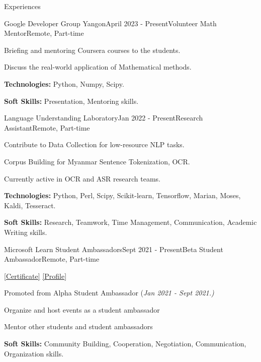 \documentclass{resume} %
\begin{document}

\begin{rSection}{Experiences}

    \begin{rSubsection}{Google Developer Group Yangon}{April 2023 - Present}{Volunteer Math Mentor}{Remote, Part-time}
        \item Briefing and mentoring Coursera courses to the students.
        \item Discuss the real-world application of Mathematical methods.
        \item \textbf{Technologies:} Python, Numpy, Scipy.
        \item {\textbf{Soft Skills:} Presentation, Mentoring skills.}
    \end{rSubsection}

    \begin{rSubsection}{Language Understanding Laboratory}{Jan 2022 - Present}{Research Assistant}{Remote, Part-time}
        \item Contribute to Data Collection for low-resource NLP tasks.
        \item Corpus Building for Myanmar Sentence Tokenization, OCR.
        \item Currently active in OCR and ASR research teams.
        \item \textbf{Technologies:} Python, Perl, Scipy, Scikit-learn, Tensorflow, Marian, Moses, Kaldi, Tesseract.
        \item {\textbf{Soft Skills:} Research, Teamwork, Time Management, Communication, Academic Writing skills.}
    \end{rSubsection}
    
    \begin{rSubsection}{Microsoft Learn Student Ambassadors}{Sept 2021 - Present}{Beta Student Ambassador}{Remote, Part-time}
        \item \href{https://imgur.com/gallery/yHH1mQK}{[\underline{Certificate}]} \href{https://studentambassadors.microsoft.com/en-US/studentambassadors/profile/1ee3ce6d-2f73-4327-9a99-1b7f980a0154}{[\underline{Profile}]}
      \item Promoted from Alpha Student Ambassador (\textit{Jan 2021 - Sept 2021.)}
        \item Organize and host events as a student ambassador
        \item Mentor other students and student ambassadors
        \item \textbf{Soft Skills:} Community Building, Cooperation, Negotiation, Communication, Organization skills.
    \end{rSubsection}
    

\end{rSection}
\end{document}
